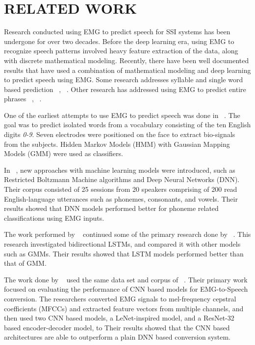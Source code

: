 \documentclass{article}
\begin{document}
\section{RELATED WORK}
\label{sec:RELATED WORK}

Research conducted using EMG to predict speech for SSI systems has been undergone for over two decades. Before the deep learning era, using EMG to recognize speech patterns involved heavy feature extraction of the data, along with discrete mathematical modeling. Recently, there have been well documented results that have used a combination of mathematical modeling and deep learning to predict speech using EMG. Some research addresses syllable and single word based prediction ~\cite{lopez-larraz_syllable-based_2010}, ~\cite{maier-hein_session_2005}. Other research has addressed using EMG to predict entire phrases ~\cite{janke_emg--speech:_2017}, ~\cite{kapur_alterego:_2018}.

One of the earliest attempts to use EMG to predict speech was done in ~\cite{maier-hein_session_2005}. The goal was to predict isolated words from a vocabulary consisting of the ten English digits \textit{0-9}. Seven electrodes were positioned on the face to extract bio-signals from the subjects. Hidden Markov Models (HMM) with Gaussian Mapping Models (GMM) were used as classifiers. 

In ~\cite{wand_pattern_2014}, new approaches with machine learning models were introduced, such as Restricted Boltzmann Machine algorithms and Deep Neural Networks (DNN). Their corpus consisted of 25 sessions from 20 speakers comprising of 200 read English-language utterances such as phonemes, consonants, and vowels. Their results showed that DNN models performed better for phoneme related classifications using EMG inputs. 

The work performed by ~\cite{janke_emg--speech:_2017} continued some of the primary research done by ~\cite{wand_pattern_2014}. This research investigated bidirectional LSTMs, and compared it with other models such as GMMs. Their results showed that LSTM models performed better than that of GMM.

The work done by ~\cite{diener_session-independent_nodate} used the same data set and corpus of ~\cite{janke_emg--speech:_2017}. Their primary work focused on evaluating the performance of CNN based models for EMG-to-Speech conversion. The researchers converted EMG signals to mel-frequency cepstral coefficients (MFCCs) and extracted feature vectors from multiple channels, and then used two CNN based models,  a LeNet-inspired model, and a ResNet-32 based encoder-decoder model, to  Their results showed that the CNN based architectures are able to outperform a plain DNN based conversion system.
\end{document}
